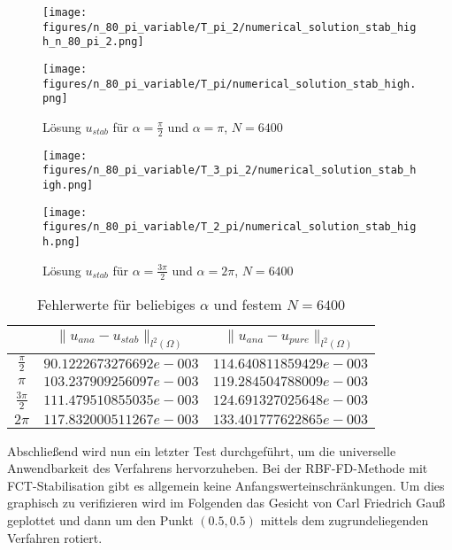 \documentclass[12pt,titlepage]{article}
\begin{document}
\begin{figure}[H]
\hspace{0.1cm}
\begin{minipage}{0.4\textwidth}
\texttt{[image: figures/n\_80\_pi\_variable/T\_pi\_2/numerical\_solution\_stab\_high\_n\_80\_pi\_2.png]}
\end{minipage}
\hspace{1.4cm}
\begin{minipage}{0.4\textwidth}
\texttt{[image: figures/n\_80\_pi\_variable/T\_pi/numerical\_solution\_stab\_high.png]}
\end{minipage}
\caption{Lösung $u_{stab}$ für $\alpha=\frac{\pi}{2}$ und $\alpha=\pi$, $N=6400$}
\label{fig:stab_80_pi}
\end{figure}
\begin{figure}[H]
\hspace{0.1cm}
\begin{minipage}{0.4\textwidth}
\texttt{[image: figures/n\_80\_pi\_variable/T\_3\_pi\_2/numerical\_solution\_stab\_high.png]}
\end{minipage}
\hspace{1.4cm}
\begin{minipage}{0.4\textwidth}
\texttt{[image: figures/n\_80\_pi\_variable/T\_2\_pi/numerical\_solution\_stab\_high.png]}
\end{minipage}
\caption{Lösung $u_{stab}$ für $\alpha=\frac{3\pi}{2}$ und $\alpha=2\pi$, $N=6400$}
\label{fig:stab_80_2pi}
\end{figure}
\noindent
\begin{table}[H]
\centering
\begin{tabular}[\textwidth]{|c|c|c|}
\hline
  & $\|u_{ana}-u_{stab}\|_{l^2(\Omega)}$ & $\|u_{ana}-u_{pure}\|_{l^2(\Omega)}$\\
\hline
$\frac{\pi}{2}$ & $90.1222673276692e-003$ & $114.640811859429e-003$\\
$\pi$ & $103.237909256097e-003$ & $119.284504788009e-003$\\
\hline
$\frac{3\pi}{2}$ & $111.479510855035e-003$ & $124.691327025648e-003$\\
$2\pi$ & $117.832000511267e-003$ & $133.401777622865e-003$\\
\hline
\end{tabular}
\caption{Fehlerwerte für beliebiges $\alpha$ und festem $N=6400$}
\label{tab:fehler_N_rotation}
\end{table}
\noindent
Abschließend wird nun ein letzter Test durchgeführt, um die universelle Anwendbarkeit des Verfahrens hervorzuheben. Bei der RBF-FD-Methode mit FCT-Stabilisation gibt es allgemein keine Anfangswerteinschränkungen. Um dies graphisch zu verifizieren wird im Folgenden das Gesicht von Carl Friedrich Gauß geplottet und dann um den Punkt $(0.5,0.5)$ mittels dem zugrundeliegenden Verfahren rotiert.\\
\end{document}
